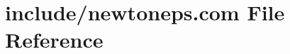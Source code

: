 \hypertarget{home_2abonfi_2_c_f_d__codes_2_eul_f_s_83_84_2include_2newtoneps_8com}{\section{include/newtoneps.com File Reference}
\label{home_2abonfi_2_c_f_d__codes_2_eul_f_s_83_84_2include_2newtoneps_8com}
}
